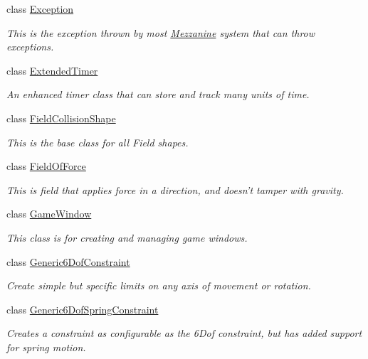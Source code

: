 \begin{DoxyCompactItemize}
class \hyperlink{classMezzanine_1_1Exception}{Exception}
\begin{DoxyCompactList}\small\item\em This is the exception thrown by most \hyperlink{namespaceMezzanine}{Mezzanine} system that can throw exceptions. \item\end{DoxyCompactList}\item 
class \hyperlink{classMezzanine_1_1ExtendedTimer}{ExtendedTimer}
\begin{DoxyCompactList}\small\item\em An enhanced timer class that can store and track many units of time. \item\end{DoxyCompactList}\item 
class \hyperlink{classMezzanine_1_1FieldCollisionShape}{FieldCollisionShape}
\begin{DoxyCompactList}\small\item\em This is the base class for all Field shapes. \item\end{DoxyCompactList}\item 
class \hyperlink{classMezzanine_1_1FieldOfForce}{FieldOfForce}
\begin{DoxyCompactList}\small\item\em This is field that applies force in a direction, and doesn't tamper with gravity. \item\end{DoxyCompactList}\item 
class \hyperlink{classMezzanine_1_1GameWindow}{GameWindow}
\begin{DoxyCompactList}\small\item\em This class is for creating and managing game windows. \item\end{DoxyCompactList}\item 
class \hyperlink{classMezzanine_1_1Generic6DofConstraint}{Generic6DofConstraint}
\begin{DoxyCompactList}\small\item\em Create simple but specific limits on any axis of movement or rotation. \item\end{DoxyCompactList}\item 
class \hyperlink{classMezzanine_1_1Generic6DofSpringConstraint}{Generic6DofSpringConstraint}
\begin{DoxyCompactList}\small\item\em Creates a constraint as configurable as the 6Dof constraint, but has added support for spring motion. \item\end{DoxyCompactList}\item 

\end{DoxyCompactItemize}

